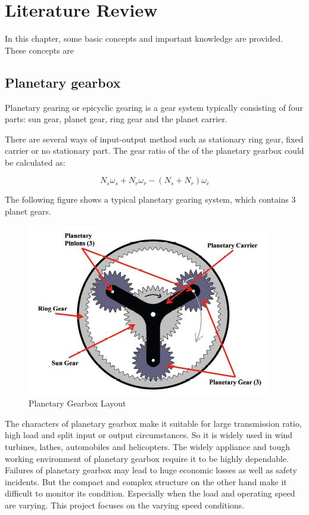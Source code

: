 \chapter{Literature Review}\label{ch:literature}

In this chapter, some basic concepts and important knowledge are provided. These concepts are 

\section{Planetary gearbox}

Planetary gearing or epicyclic gearing is a gear system typically consisting of four parts: sun gear, planet gear, ring gear and the planet carrier.

There are several ways of input-output method such as stationary ring gear, fixed carrier or no stationary part. The gear ratio of the of the planetary gearbox could be calculated as:

\begin{equation}
	N_s\omega_s + N_r\omega_r - (N_s + N_r)\omega_c
\end{equation}

The following figure shows a typical planetary gearing system, which contains 3 planet gears.


\begin{figure}
	\centering
	\includegraphics{PGB}
	\caption{Planetary Gearbox Layout\cite{gearbox}}
	\label{simulationfigure}
\end{figure}

The characters of planetary gearbox make it suitable for large transmission ratio, high load and split input or output circumstances. So it is widely used in wind turbines, lathes, automobiles and helicopters. The widely appliance and tough working environment of planetary gearbox require it to be highly dependable. Failures of planetary gearbox may lead to huge economic losses as well as safety incidents. But the compact and complex structure on the other hand make it difficult to monitor its condition. Especially when the load and operating speed are varying. This project focuses on the varying speed conditions.




